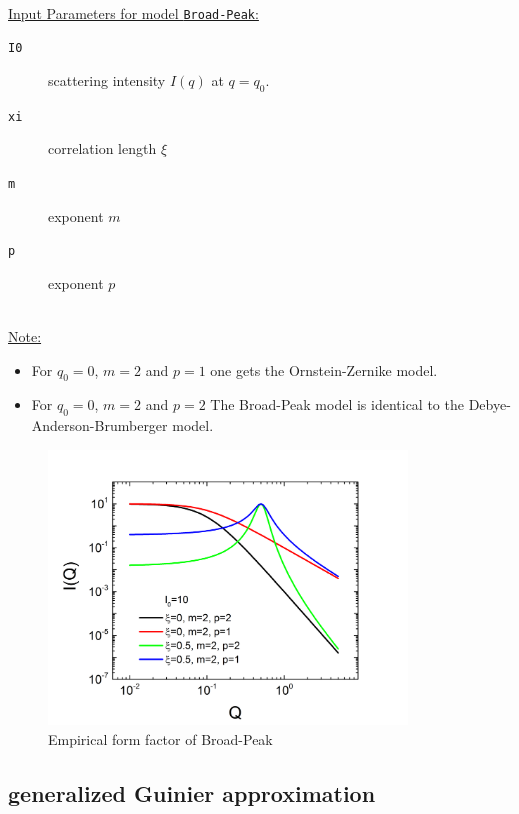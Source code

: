 \hspace{1pt}\\
\underline{Input Parameters for model \texttt{Broad-Peak}:}\\
\begin{description}
\item[\texttt{I0}] scattering intensity $I(q)$ at $q=q_0$.
\item[\texttt{xi}] correlation length $\xi$
\item[\texttt{m}] exponent $m$
\item[\texttt{p}] exponent $p$
\end{description}

\hspace{1pt}\\
\underline{Note:}
\begin{itemize}
\item For $q_0=0$, $m=2$ and $p=1$ one gets the Ornstein-Zernike model.
\item For $q_0=0$, $m=2$ and $p=2$ The Broad-Peak model is identical to the Debye-Anderson-Brumberger model.
\end{itemize}

\begin{figure}[htb]
\begin{center}
\includegraphics[width=0.85\textwidth,height=0.6\textwidth]{BroadPeak.png}
\end{center}
\caption{Empirical form factor of Broad-Peak} \label{fig:BroadPeakIq}
\end{figure}

\clearpage
\subsection{generalized Guinier approximation \cite{Fratzl1994,Hjelm1992,Hjelm1995,Hjelm2000}}
\label{sec:generalizedGuinier}  ~\\

